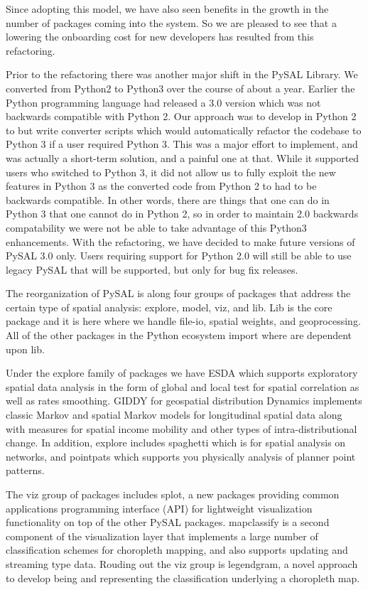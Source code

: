\documentclass[11pt]{article}
\begin{document}
Since adopting this model, we have also seen benefits in the growth in the number
of packages coming into the system. So we are pleased to see that a lowering the
onboarding cost for new developers has resulted from this refactoring.


Prior to the refactoring there was another major shift in the PySAL Library. We
converted from Python2 to Python3 over the course of about a year. Earlier the
Python programming language had released a 3.0 version which was not backwards
compatible with Python 2. Our approach was to develop in Python 2 to but write
converter scripts which would automatically refactor the codebase to Python 3
if a user required Python 3. This was a major effort to implement, and was
actually a short-term solution, and a painful one at that. While it supported
users who switched to Python 3, it did not allow us to fully exploit the new
features in Python 3 as the converted code from Python 2 to had to be backwards
compatible. In other words, there are things that one can do in Python 3 that
one cannot do in Python 2, so in order to maintain 2.0 backwards compatability
we were not be able to take advantage of this Python3 enhancements. With the
refactoring, we have decided to make future versions of PySAL 3.0 only. Users
requiring support for Python 2.0 will still be able to use legacy PySAL that
will be supported, but only for bug fix releases.


The reorganization of PySAL is along four groups of packages that address the
certain type of spatial analysis: explore, model, viz, and lib. Lib is the core
package and it is here where we handle file-io, spatial weights, and
geoprocessing. All of the other packages in the Python ecosystem import where
are dependent upon lib.

Under the explore family of packages we have ESDA which supports exploratory
spatial data analysis in the form of global and local test for spatial
correlation as well as rates smoothing. GIDDY for geospatial distribution
Dynamics implements classic Markov and spatial Markov models for longitudinal
spatial data along with measures for spatial income mobility and other types of
intra-distributional change. In addition, explore includes spaghetti which is
for spatial analysis on networks, and pointpats which supports you
physically analysis of planner point patterns.

The viz group of packages includes splot, a new packages providing common applications programming interface (API) for lightweight visualization
functionality on top of the other PySAL packages. mapclassify is a second
component of the visualization layer that implements a large number of
classification schemes for choropleth mapping, and also supports updating and
streaming type data. Rouding out the viz group is legendgram, a novel approach
to develop being and representing the classification underlying a choropleth
map.
\end{document}
